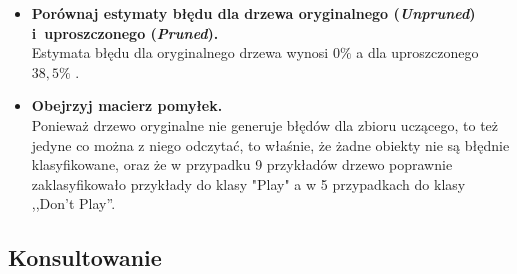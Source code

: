 \begin{itemize}
\item \textbf{Porównaj estymaty błędu dla drzewa oryginalnego (\emph{Unpruned}) i~uproszczonego (\emph{Pruned}).}
\\Estymata błędu dla oryginalnego drzewa wynosi  $ 0\% $ a dla uproszczonego $ 38,5\% $ .

\item \textbf{Obejrzyj macierz pomyłek.}
\\Ponieważ drzewo oryginalne nie generuje błędów dla zbioru uczącego, to też jedyne co można z niego odczytać, to właśnie, że żadne obiekty nie są błędnie klasyfikowane, oraz że w przypadku 9 przykładów drzewo poprawnie zaklasyfikowało przykłady do klasy "Play" a w 5 przypadkach do klasy ,,Don't Play''.

\end{itemize}

\subsection{Konsultowanie}

